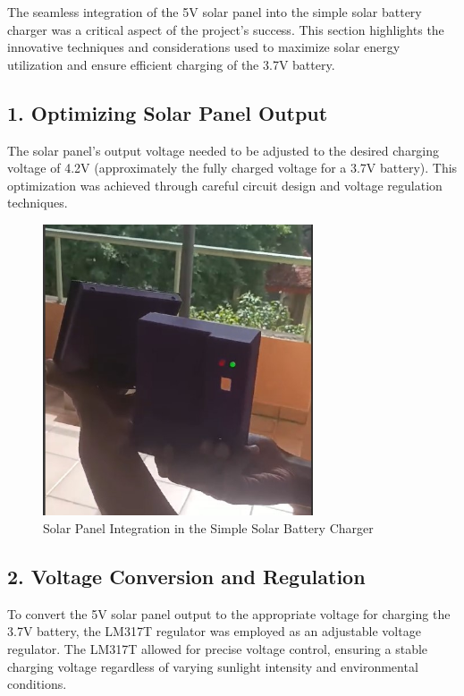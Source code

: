 \documentclass[twocolumn]{article}
\begin{document}
The seamless integration of the 5V solar panel into the simple solar battery charger was a critical aspect of the project's success. This section highlights the innovative techniques and considerations used to maximize solar energy utilization and ensure efficient charging of the 3.7V battery.

\subsection*{1. Optimizing Solar Panel Output}

The solar panel's output voltage needed to be adjusted to the desired charging voltage of 4.2V (approximately the fully charged voltage for a 3.7V battery). This optimization was achieved through careful circuit design and voltage regulation techniques.

\begin{figure}[htbp]
  \centering
  \includegraphics[width=8cm]{18.jpg}
  \caption{Solar Panel Integration in the Simple Solar Battery Charger}
  \label{fig:solar_panel_integration}
\end{figure}

\subsection*{2. Voltage Conversion and Regulation}

To convert the 5V solar panel output to the appropriate voltage for charging the 3.7V battery, the LM317T regulator was employed as an adjustable voltage regulator. The LM317T allowed for precise voltage control, ensuring a stable charging voltage regardless of varying sunlight intensity and environmental conditions.
\end{document}
